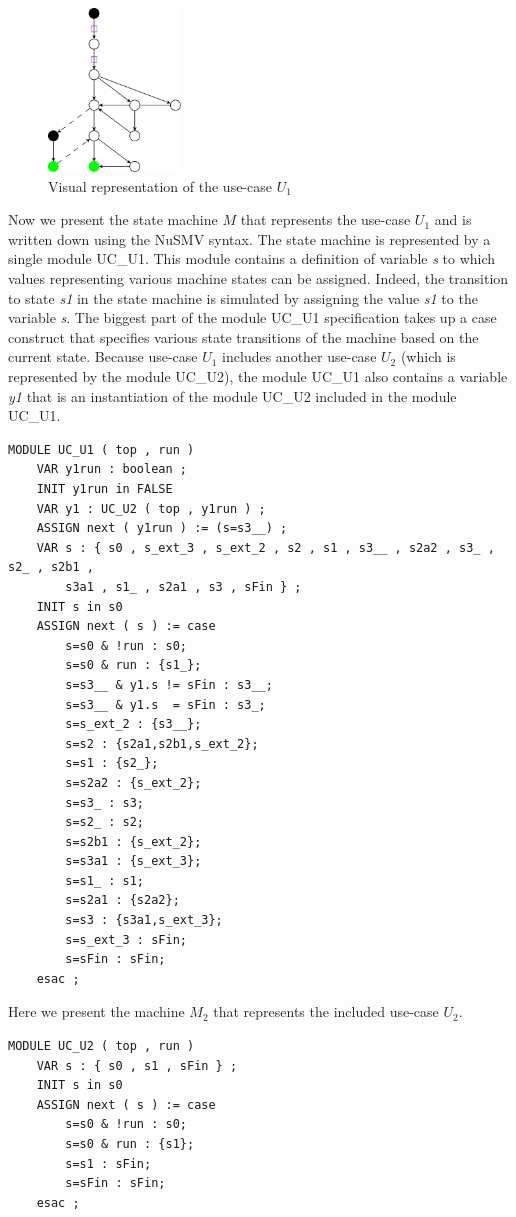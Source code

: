 \begin{figure}[ht]
  \centering
  \includegraphics[width=100pt]{images/u1}
  \caption{Visual representation of the use-case $U_1$}
  \label{fig:use-case U1}
\end{figure}

Now we present the state machine $M$ that represents the use-case $U_1$ and is written down using the NuSMV syntax. The state machine is represented by a single module UC\_U1.
This module contains a definition of variable \emph{s} to which values representing various machine states can be assigned.
Indeed, the transition to state \emph{s1} in the state machine is simulated by assigning the value \emph{s1} to the variable \emph{s}. The biggest part of the module UC\_U1 specification takes up a case construct that specifies various state transitions of the machine based on the current state. Because use-case $U_1$ includes another use-case $U_2$ (which is represented by the module UC\_U2), the module UC\_U1 also contains a variable \emph{y1} that is an instantiation of the module UC\_U2 included in the module UC\_U1.
\begin{lstlisting}
MODULE UC_U1 ( top , run )
	VAR y1run : boolean ;
	INIT y1run in FALSE
	VAR y1 : UC_U2 ( top , y1run ) ;
	ASSIGN next ( y1run ) := (s=s3__) ;
	VAR s : { s0 , s_ext_3 , s_ext_2 , s2 , s1 , s3__ , s2a2 , s3_ , s2_ , s2b1 ,
		s3a1 , s1_ , s2a1 , s3 , sFin } ;
	INIT s in s0
	ASSIGN next ( s ) := case
		s=s0 & !run : s0;
		s=s0 & run : {s1_};
		s=s3__ & y1.s != sFin : s3__;
		s=s3__ & y1.s  = sFin : s3_;
		s=s_ext_2 : {s3__};
		s=s2 : {s2a1,s2b1,s_ext_2};
		s=s1 : {s2_};
		s=s2a2 : {s_ext_2};
		s=s3_ : s3;
		s=s2_ : s2;
		s=s2b1 : {s_ext_2};
		s=s3a1 : {s_ext_3};
		s=s1_ : s1;
		s=s2a1 : {s2a2};
		s=s3 : {s3a1,s_ext_3};
		s=s_ext_3 : sFin;
		s=sFin : sFin;
	esac ;
\end{lstlisting}

Here we present the machine $M_2$ that represents the included use-case $U_2$.
\begin{lstlisting}
MODULE UC_U2 ( top , run )
	VAR s : { s0 , s1 , sFin } ;
	INIT s in s0
	ASSIGN next ( s ) := case
		s=s0 & !run : s0;
		s=s0 & run : {s1};
		s=s1 : sFin;
		s=sFin : sFin;
	esac ;
\end{lstlisting}

